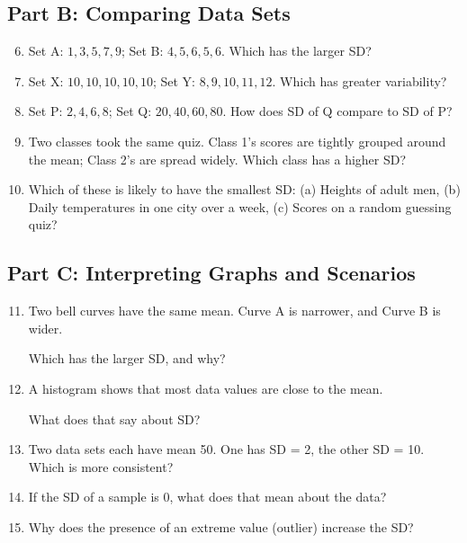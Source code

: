 \documentclass[14pt]{extarticle}
\begin{document}
\subsection*{Part B: Comparing Data Sets}
\begin{enumerate}
  \setcounter{enumi}{5}
  \item Set A: \(1, 3, 5, 7, 9\); Set B: \(4, 5, 6, 5, 6\). Which has the larger SD?
  \item Set X: \(10, 10, 10, 10, 10\); Set Y: \(8, 9, 10, 11, 12\). Which has greater variability?
  \item Set P: \(2, 4, 6, 8\); Set Q: \(20, 40, 60, 80\). How does SD of Q compare to SD of P?
  \item Two classes took the same quiz. Class 1’s scores are tightly grouped around the mean; Class 2’s are spread widely. Which class has a higher SD?
  \item Which of these is likely to have the smallest SD:  
  (a) Heights of adult men, (b) Daily temperatures in one city over a week, (c) Scores on a random guessing quiz?
\end{enumerate}

\subsection*{Part C: Interpreting Graphs and Scenarios}
\begin{enumerate}
  \setcounter{enumi}{10}
  \item Two bell curves have the same mean. Curve A is narrower, and Curve B is wider.
  Which has the larger SD, and why?
  \item A histogram shows that most data values are close to the mean.
  What does that say about SD?
  \item Two data sets each have mean 50. One has SD = 2, the other SD = 10. Which is more consistent?
  \item If the SD of a sample is 0, what does that mean about the data?
  \item Why does the presence of an extreme value (outlier) increase the SD?
\end{enumerate}
\end{document}
